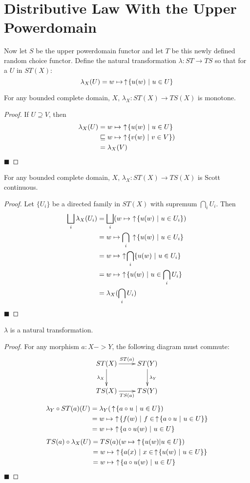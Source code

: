 \section{Distributive Law With the Upper Powerdomain}

Now let $S$ be the upper powerdomain functor and let $T$ be this newly defined random choice functor.  Define the natural transformation $\lambda:ST\to TS$ so that for a $U$ in $ST(X)$:
\[
\lambda_X(U) = w\mapsto \,\uparrow\! \{u(w)\ |\ u\in U\}
\]
\begin{proposition}
For any bounded complete domain, $X$, $\lambda_X:ST(X)\to TS(X)$ is monotone.
\end{proposition}
\begin{proof}
If $U\supseteq V$, then
\begin{align*}
\lambda_X(U) &= w\mapsto\, \,\uparrow\! \{u(w)\ |\ u\in U\} \\
&\sqsubseteq w\mapsto\, \,\uparrow\! \{v(w)\ |\ v\in V\}) \\
&= \lambda_X(V)
\end{align*}\hfill $\blacksquare$
\end{proof}
\begin{proposition}
For any bounded complete domain, $X$, $\lambda_X:ST(X)\to TS(X)$ is Scott continuous.
\end{proposition}
\begin{proof}
Let $\{U_i\}$ be a directed family in $ST(X)$ with supremum $\bigcap_i U_i$.  Then
\begin{align*}
\bigsqcup_i \lambda_X(U_i) &= \bigsqcup_i (w\mapsto\, \ua \{u(w)\ |\ u\in U_i\}) \\ 
&= w\mapsto \bigcap_i \ua \{u(w)\ |\ u\in U_i\} \\
&= w\mapsto \,\ua \bigcap_i \{u(w)\ |\ u\in U_i\} \\
&= w\mapsto \,\ua \{u(w)\ |\ u\in \bigcap_i U_i\} \\
&= \lambda_X(\bigcap_i U_i)
\end{align*}\hfill $\blacksquare$
\end{proof}
\begin{proposition}
$\lambda$ is a natural transformation.
\end{proposition}
\begin{proof}
For any morphism $a:X->Y$, the following diagram must commute:
\[
\xymatrix{
ST(X)\ar[r]^{ST(a)}\ar[d]_{\lambda_X} & ST(Y)\ar[d]^{\lambda_Y} \\
TS(X)\ar[r]_{TS(a)} &TS(Y)
}
\]
\begin{align*}
\lambda_Y\circ ST(a)(U) &= \lambda_Y(\,\uparrow\! \{a\circ u\ |\ u\in U\}) \\
&= w\mapsto \,\,\uparrow\! \{f(w)\ |\ f\in \,\uparrow\! \{a\circ u\ |\ u\in U\}\} \\
&= w\mapsto \,\,\uparrow\! \{a\circ u(w)\ |\ u\in U\}
\end{align*}
\begin{align*}
TS(a)\circ \lambda_X(U) &= TS(a)(w\mapsto \,\,\uparrow\! \{u(w)|u\in U\}) \\
&= w\mapsto \,\,\uparrow\! \{a(x)\ |\ x\in \,\uparrow\! \{u(w)\ |\ u\in U\}\} \\
&= w\mapsto \,\,\uparrow\! \{a\circ u(w)\ |\ u\in U\}
\end{align*}\hfill $\blacksquare$
\end{proof}

